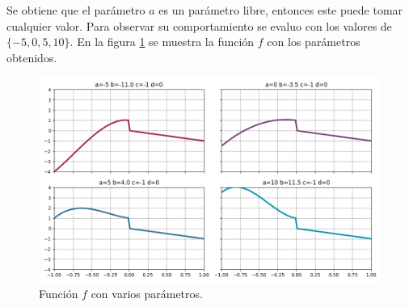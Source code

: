 \begin{enumerate}
          Se obtiene que el parámetro $a$ es un parámetro libre, entonces este puede tomar cualquier valor. Para observar su comportamiento se evaluo con los valores de $\{-5,0,5,10\}$. En la figura \ref{fig:problema02b} se muestra la función $f$ con los parámetros obtenidos.
          \begin{figure}[H]
              \centering
              \includegraphics[width=14cm]{Graphics/problema02b.png}
              \caption{Función $f$ con varios parámetros.}
              \label{fig:problema02b}
          \end{figure}
\end{enumerate}
\pagebreak